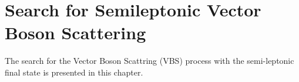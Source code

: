 \chapter{Search for Semileptonic Vector Boson Scattering}

The search for the Vector Boson Scattring (VBS) process with the semi-leptonic final state is presented in this chapter.


%

%

%

%

%

%


